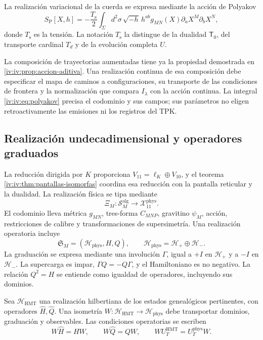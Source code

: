 La realización variacional de la cuerda se expresa mediante
la acción de Polyakov
\begin{equation}
 S_{\mathrm P}[X,h]
 =-\frac{T_{\mathrm s}}2\int_\Sigma d^2\sigma\,
 \sqrt{-h}\,h^{ab}g_{MN}(X)
             \partial_aX^M\partial_bX^N,
 \label{iv:iv:eq:polyakov}
\end{equation}
donde \(T_{\mathrm s}\) es la tensión. La notación
\(T_{\mathrm s}\) la distingue de la dualidad
\(\mathsf T_0\), del transporte cardinal \(T_d\)
y de la evolución completa \(U\).

La composición de trayectorias aumentadas tiene ya la
propiedad demostrada en \ref{iv:iv:prop:accion-aditiva}.
Una realización continua de esa composición debe
especificar el mapa de caminos a configuraciones,
su transporte de las condiciones de frontera y la
normalización que compara \(I_\lambda\) con la acción
continua. La integral \eqref{iv:iv:eq:polyakov} precisa
el codominio y sus campos; sus parámetros no eligen
retroactivamente las emisiones ni los registros del TPK.

\subsection{Realización undecadimensional y operadores graduados}

La reducción dirigida por \(K\) proporciona
\(V_{11}=\ell_K\oplus V_{10}\), y el teorema
\ref{iv:iv:thm:pantallas-isomorfas} coordina esa reducción
con la pantalla reticular y la dualidad. La realización
física se tipa mediante
\[
 \Xi_M:\mathscr S_M^{\mathrm{alg}}
                  \longrightarrow\mathcal X_{11}^{\mathrm{phys}}.
\]
El codominio lleva métrica \(g_{MN}\), tres-forma
\(C_{MNP}\), gravitino \(\psi_M\), acción,
restricciones de calibre y transformaciones de
supersimetría. Una realización operatoria incluye
\[
 \mathfrak S_M=(\mathcal H_{\mathrm{phys}},H,Q),\qquad
 \mathcal H_{\mathrm{phys}}=\mathcal H_+\oplus\mathcal H_-.
\]
La graduación se expresa mediante una involución
\(\Gamma\), igual a \(+I\) en \(\mathcal H_+\)
y a \(-I\) en \(\mathcal H_-\). La supercarga
es impar, \(\Gamma Q=-Q\Gamma\), y el
Hamiltoniano es no negativo. La relación
\(Q^2=H\) se entiende como igualdad de operadores,
incluyendo sus dominios.

Sea \(\mathcal H_{\mathrm{HMT}}\) una realización
hilbertiana de los estados genealógicos pertinentes,
con operadores \(\widehat H,\widehat Q\). Una
isometría \(W:\mathcal H_{\mathrm{HMT}}\to
\mathcal H_{\mathrm{phys}}\) debe transportar
dominios, graduación y observables. Las condiciones
operatorias se escriben
\begin{equation}
 W\widehat H=HW,\qquad
 W\widehat Q=QW,\qquad
 WU_T^{\mathrm{HMT}}=U_T^{\mathrm{phys}}W.
 \label{iv:iv:eq:entrelazamiento-fisico}
\end{equation}

